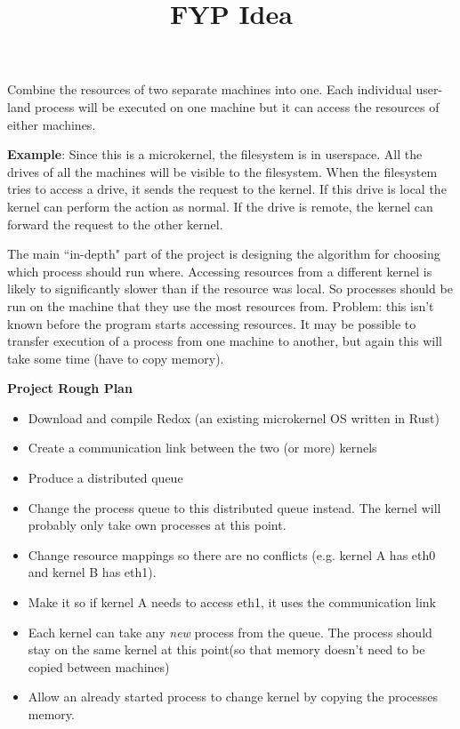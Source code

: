 \documentclass[11pt, a4paper]{article}
\title{\huge\textbf{FYP Idea}\vspace{-4ex}}
\date{}
\begin{document}
\maketitle

Combine the resources of two separate machines into one. Each individual 
user-land process will be executed on one machine but it can access the 
resources of either machines. 

\textbf{Example}: Since this is a microkernel, the filesystem is in userspace. 
All the drives of all the machines will be visible to the filesystem. When the 
filesystem tries to access a drive, it sends the request to the kernel. If this 
drive is local the kernel can perform the action as normal. If the drive is 
remote, the kernel can forward the request to the other kernel.

The main ``in-depth" part of the project is designing the algorithm for 
choosing which process should run where. Accessing resources from a different 
kernel is likely to significantly slower than if the resource was local. So 
processes should be run on the machine that they use the most resources from. 
Problem: this isn't known before the program starts accessing resources. It may 
be possible to transfer execution of a process from one machine to another, but 
again this will take some time (have to copy memory).

\textbf{Project Rough Plan}
\begin{itemize}
	\item Download and compile Redox (an existing microkernel OS written in 
	Rust)
	
	\item Create a communication link between the two (or more) kernels
	
	\item Produce a distributed queue
	
	\item Change the process queue to this distributed queue instead. The 
	kernel will probably only take own processes at this point.
	
	\item Change resource mappings so there are no conflicts (e.g. kernel 
	A has eth0 and kernel B has eth1).
	
	\item Make it so if kernel A needs to access eth1, it uses the 
	communication link
	
	\item Each kernel can take any \textit{new} process from the queue. The 
	process should stay on the same kernel at this point(so that memory doesn't 
	need to be copied between machines)
	
	\item Allow an already started process to change kernel by copying the 
	processes memory.
	
\end{itemize}
\end{document}
